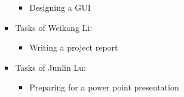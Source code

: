 \begin{itemize}
\begin{itemize}
\begin{itemize}
\begin{itemize}
			\item {Designing a GUI}
		\end{itemize}
		\item {Tasks of Weikang Li:}
		\begin{itemize}
			\item {Writing a project report}
		\end{itemize}
		\item {Tasks of Junlin Lu:}
		\begin{itemize}
			\item {Preparing for a power point presentation}
		\end{itemize}
	\end{itemize}
\end{itemize} 
\end{itemize}

